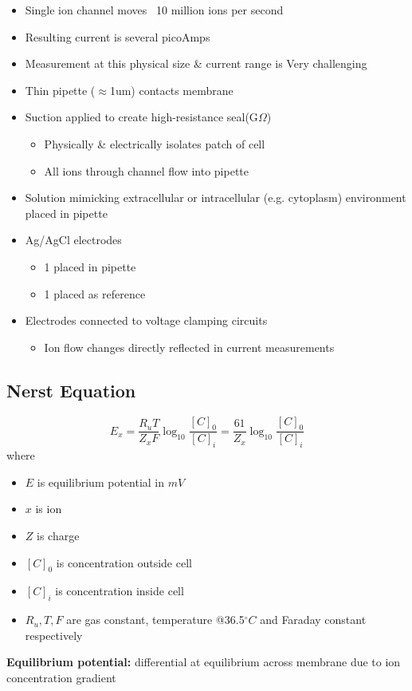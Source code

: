 \documentclass[11pt,fleqn]{book}
\begin{document}
\begin{itemize}
    \item Single ion channel moves ~10 million ions per second
    \item Resulting current is several picoAmps
    \item Measurement at this physical size \& current range is Very challenging
    \item Thin pipette ($\approx$1um) contacts membrane
    \item Suction applied to create high-resistance seal(G$\Omega$)
    \begin{itemize}
        \item Physically \& electrically isolates patch of cell
        \item All ions through channel flow into pipette
    \end{itemize}
    \item Solution mimicking extracellular or intracellular (e.g. cytoplasm) environment placed in pipette
    \item Ag/AgCl electrodes
    \begin{itemize}
        \item 1 placed in pipette
        \item 1 placed as reference
    \end{itemize}
    \item Electrodes connected to voltage clamping circuits
    \begin{itemize}
        \item Ion flow changes directly reflected in current measurements
    \end{itemize}
\end{itemize}

\subsection{Nerst Equation}
\begin{theorem}
    $$E_x=\frac{R_uT}{Z_xF}\log_{10}\frac{[C]_0}{[C]_i}=\frac{61}{Z_x}\log_{10}\frac{[C]_0}{[C]_i}$$
    where
    \begin{itemize}
        \item $E$ is equilibrium potential in $mV$
        \item $x$ is ion
        \item $Z$ is charge
        \item $[C]_0$ is concentration outside cell
        \item $[C]_i$ is concentration inside cell
        \item $R_u,T,F$ are gas constant, temperature @36.5$^\circ C$ and Faraday constant respectively
    \end{itemize}
    \textbf{Equilibrium potential:} differential at equilibrium across membrane due to ion concentration gradient
\end{theorem}
\end{document}
